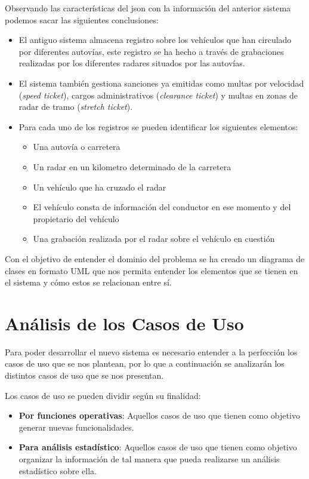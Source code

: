 \documentclass[]{article}
\begin{document}
Observando las características del json con la información del anterior sistema podemos sacar las siguientes conclusiones:
\begin{itemize}
    \item El antiguo sistema almacena registro sobre los vehículos que han circulado por diferentes autovías, este registro se ha hecho a través de grabaciones realizadas por los diferentes radares situados por las autovías.
    \item El sistema también gestiona sanciones ya emitidas como multas por velocidad (\textit{speed ticket}), cargos administrativos (\textit{clearance ticket}) y multas en zonas de radar de tramo (\textit{stretch ticket}).
    \item Para cada uno de los registros se pueden identificar los siguientes elementos:
    \begin{itemize}
        \item Una autovía o carretera
        \item Un radar en un kilometro determinado de la carretera
        \item Un vehículo que ha cruzado el radar
        \item El vehículo consta de información del conductor en ese momento y del propietario del vehículo
        \item Una grabación realizada por el radar sobre el vehículo en cuestión
    \end{itemize} 
\end{itemize}

Con el objetivo de entender el dominio del problema se ha creado un diagrama de clases en formato UML que nos permita entender los elementos que se tienen en el sistema y cómo estos se relacionan entre sí.

\section{Análisis de los Casos de Uso}
\label{sec:analisis_casos_de_uso}

Para poder desarrollar el nuevo sistema es necesario entender a la perfección los casos de uso que se nos plantean, por lo que a continuación se analizarán los distintos casos de uso que se nos presentan.

Los casos de uso se pueden dividir según su finalidad:
\begin{itemize}
    \item \textbf{Por funciones operativas}: Aquellos casos de uso que tienen como objetivo generar nuevas funcionalidades.
    \item \textbf{Para análisis estadístico}: Aquellos casos de uso que tienen como objetivo organizar la información de tal manera que pueda realizarse un análisis estadístico sobre ella.
\end{itemize}
\end{document}
